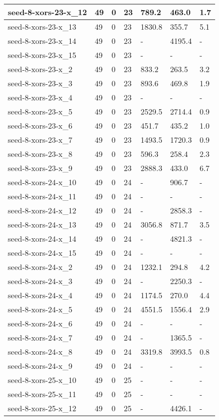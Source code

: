 \begin{scriptsize}
\begin{longtable}{|p{5cm}|l|l|l|l|l|l|}
seed-8-xors-23-x\_12&49&0&23&789.2&463.0&1.7 \\ \hline 
seed-8-xors-23-x\_13&49&0&23&1830.8&355.7&5.1 \\ \hline 
seed-8-xors-23-x\_14&49&0&23&-&4195.4&- \\ \hline 
seed-8-xors-23-x\_15&49&0&23&-&-&- \\ \hline 
seed-8-xors-23-x\_2&49&0&23&833.2&263.5&3.2 \\ \hline 
seed-8-xors-23-x\_3&49&0&23&893.6&469.8&1.9 \\ \hline 
seed-8-xors-23-x\_4&49&0&23&-&-&- \\ \hline 
seed-8-xors-23-x\_5&49&0&23&2529.5&2714.4&0.9 \\ \hline 
seed-8-xors-23-x\_6&49&0&23&451.7&435.2&1.0 \\ \hline 
seed-8-xors-23-x\_7&49&0&23&1493.5&1720.3&0.9 \\ \hline 
seed-8-xors-23-x\_8&49&0&23&596.3&258.4&2.3 \\ \hline 
seed-8-xors-23-x\_9&49&0&23&2888.3&433.0&6.7 \\ \hline 
seed-8-xors-24-x\_10&49&0&24&-&906.7&- \\ \hline 
seed-8-xors-24-x\_11&49&0&24&-&-&- \\ \hline 
seed-8-xors-24-x\_12&49&0&24&-&2858.3&- \\ \hline 
seed-8-xors-24-x\_13&49&0&24&3056.8&871.7&3.5 \\ \hline 
seed-8-xors-24-x\_14&49&0&24&-&4821.3&- \\ \hline 
seed-8-xors-24-x\_15&49&0&24&-&-&- \\ \hline 
seed-8-xors-24-x\_2&49&0&24&1232.1&294.8&4.2 \\ \hline 
seed-8-xors-24-x\_3&49&0&24&-&2250.3&- \\ \hline 
seed-8-xors-24-x\_4&49&0&24&1174.5&270.0&4.4 \\ \hline 
seed-8-xors-24-x\_5&49&0&24&4551.5&1556.4&2.9 \\ \hline 
seed-8-xors-24-x\_6&49&0&24&-&-&- \\ \hline 
seed-8-xors-24-x\_7&49&0&24&-&1365.5&- \\ \hline 
seed-8-xors-24-x\_8&49&0&24&3319.8&3993.5&0.8 \\ \hline 
seed-8-xors-24-x\_9&49&0&24&-&-&- \\ \hline 
seed-8-xors-25-x\_10&49&0&25&-&-&- \\ \hline 
seed-8-xors-25-x\_11&49&0&25&-&-&- \\ \hline 
seed-8-xors-25-x\_12&49&0&25&-&4426.1&- \\ \hline 

\end{longtable}
\end{scriptsize}
